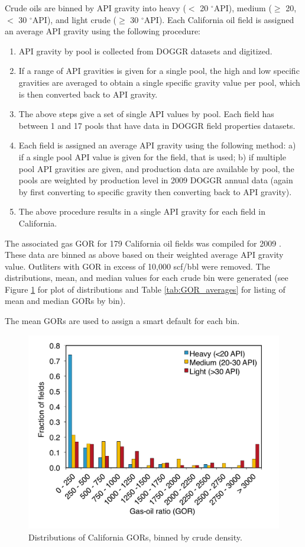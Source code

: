 \documentclass[11pt]{report}
\begin{document}
Crude oils are binned by API gravity into heavy ($<$ 20 $^\circ$API), medium ($\geq$ 20, $<$ 30 $^\circ$API), and light crude ($\geq$ 30 $^\circ$API). Each California oil field is assigned an average API gravity using the following procedure:
\begin{enumerate}
\item API gravity by pool is collected from DOGGR datasets \cite{DOGGR1982, DOGGR1992, DOGGR1998} and digitized.
\item If a range of API gravities is given for a single pool, the high and low specific gravities are averaged to obtain a single specific gravity value per pool, which is then converted back to API gravity.
\item The above steps give a set of single API values by pool. Each field has between 1 and 17 pools that have data in DOGGR field properties datasets.
\item Each field is assigned an average API gravity using the following method: a) if a single pool API value is given for the field, that is used; b) if multiple pool API gravities are given, and production data are available by pool, the pools are weighted by production level in 2009 DOGGR annual data (again by first converting to specific gravity then converting back to API gravity).
\item The above procedure results in a single API gravity for each field in California.
\end{enumerate}

The associated gas GOR for 179 California oil fields was compiled for 2009 \cite{DOGGRonline, DOGGRmonthly2010}. These data are binned as above based on their weighted average API gravity value. Outliters with GOR in excess of 10,000 scf/bbl were removed. The distributions, mean, and median values for each crude bin were generated (see Figure \ref{fig:API-GOR} for plot of distributions and Table \ref{tab:GOR_averages} for listing of mean and median GORs by bin).

The mean GORs are used to assign a smart default for each bin.

\begin{figure}
\includegraphics[width=0.8\columnwidth]{images/API-GOR.pdf}
\caption{Distributions of California GORs, binned by crude density.}
\label{fig:API-GOR}
\end{figure}
\end{document}
